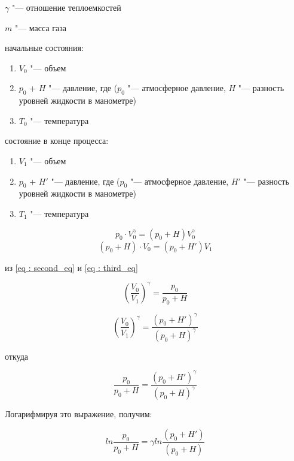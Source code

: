 \texttt{$\gamma$}  "--- отношение теплоемкостей

\texttt{$m$} "--- масса газа

начальные состояния:

\begin{enumerate}
    \item {$V_0$ "--- объем}
    \item {$p_0$ + $H$ "--- давление, где ($p_0$ "--- атмосферное давление, $H$ "--- разность уровней жидкости в манометре) }
    \item {$T_0$ "--- температура}
\end{enumerate}

состояние в конце процесса:

\begin{enumerate}
    \item {$V_1$ "---  объем}
    \item {$p_0$ + $H'$ "--- давление, где ($p_0$ "--- атмосферное давление, $H'$ "--- разность уровней жидкости в манометре) }
    \item {$T_1$ "--- температура}
\end{enumerate}

\begin{equation}
    \label{eq : second_eq}
    p_0 \cdot V_0^\gamma = (p_0 + H)V_0^\gamma
\end{equation}
\begin{equation}
    \label{eq : third_eq}
    (p_0 + H) \cdot V_0 = (p_0 + H')V_1
\end{equation}

из \ref{eq : second_eq} и \ref{eq : third_eq}

\begin{equation*}
    (\frac{V_0}{V_1})^\gamma = \frac{p_0}{p_0 + H} 
\end{equation*}

\begin{equation*}
    (\frac{V_0}{V_1})^\gamma = \frac{(p_0 + H')^\gamma }{(p_0 + H)^\gamma}
\end{equation*}

откуда 

\begin{equation*}
    \frac{p_0}{p_0 + H}  = \frac{(p_0 + H')^\gamma }{(p_0 + H)^\gamma}
\end{equation*}

Логарифмируя это выражение, получим:

\begin{equation*}
    ln \frac{p_0}{p_0 + H}  = \gamma ln \frac{(p_0 + H')}{(p_0 + H)}
\end{equation*}


